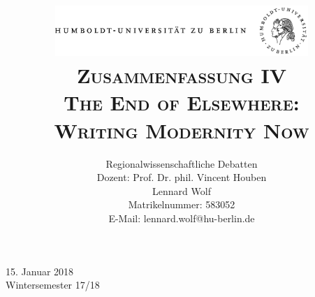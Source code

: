 \documentclass[a4paper, 12pt]{article}
\date{\vspace{-3ex}}
\begin{document}
\title{\vspace{5ex}
	\includegraphics*[bb=0 0 720 200, width=0.72\textwidth]{ErstesSem/images/hu_logo.png}\\
	\vspace{30pt}
	\scshape\LARGE{Zusammenfassung IV}\\\Large{The End of Elsewhere:\\Writing Modernity Now}\vspace{20pt}}
	


\author{Regionalwissenschaftliche Debatten\\
	\vspace{7pt}
          Dozent: Prof. Dr. phil. Vincent Houben\\\vspace{4pt}Lennard Wolf\\
        \small{Matrikelnummer: 583052}\\
        \small{E-Mail: lennard.wolf@hu-berlin.de}}


\maketitle

\vspace{\fill}

\begin{minipage}[]{0.92\textwidth}
    \centering
    \onehalfspacing
    \large   
    15. Januar 2018\\
    Wintersemester 17/18

    \vspace{-20mm} 
\end{minipage}%
\thispagestyle{empty}
\newpage
\setcounter{page}{1}
\end{document}
